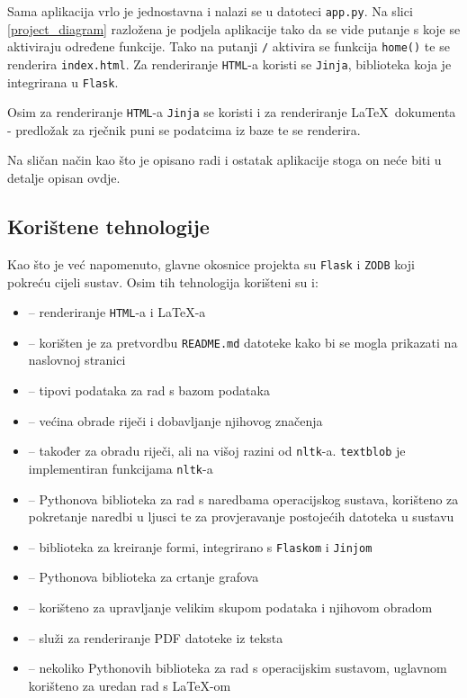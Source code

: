 \documentclass{foi}
\begin{document}
Sama aplikacija vrlo je jednostavna i nalazi se u datoteci \texttt{app.py}. Na
slici \ref{project_diagram} razložena je podjela aplikacije tako da se vide putanje s koje
se aktiviraju određene funkcije. Tako na putanji \texttt{/} aktivira se funkcija
\texttt{home()} te se renderira \texttt{index.html}. Za renderiranje
\texttt{HTML}-a koristi se \texttt{Jinja}, biblioteka koja je integrirana u
\texttt{Flask}.

Osim za renderiranje \texttt{HTML}-a \texttt{Jinja} se koristi i za
renderiranje \LaTeX\ dokumenta - predložak za rječnik puni se podatcima iz baze
te se renderira.

Na sličan način kao što je opisano radi i ostatak aplikacije stoga on neće biti
u detalje opisan ovdje.

\subsection{Korištene tehnologije}

Kao što je već napomenuto, glavne okosnice projekta su \texttt{Flask} i
\texttt{ZODB} koji pokreću cijeli sustav. Osim tih tehnologija korišteni su i:
\begin{itemize}
	\item[\texttt{Jinja}] -- renderiranje \texttt{HTML}-a i \LaTeX-a
	\item[\texttt{markdown2}] -- korišten je za pretvordbu
		\texttt{README.md} datoteke kako bi se mogla prikazati na
		naslovnoj stranici
	\item[\texttt{persistent}] -- tipovi podataka za rad s bazom podataka
	\item[\texttt{nltk}] -- većina obrade riječi i dobavljanje njihovog
		značenja
	\item[\texttt{textblob}] -- također za obradu riječi, ali na višoj
		razini od \texttt{nltk}-a. \texttt{textblob} je implementiran
		funkcijama \texttt{nltk}-a
	\item[\texttt{os}] -- Pythonova biblioteka za rad s naredbama
		operacijskog sustava, korišteno za pokretanje naredbi u ljusci
		te za provjeravanje postojećih datoteka u sustavu
	\item[\texttt{wtforms}] -- biblioteka za kreiranje formi, integrirano s
		\texttt{Flaskom} i \texttt{Jinjom}
	\item[\texttt{matplotlib}] -- Pythonova biblioteka za crtanje grafova
	\item[\texttt{padnas}] -- korišteno za upravljanje velikim skupom
		podataka i njihovom obradom
	\item[\LaTeX] -- služi za renderiranje PDF datoteke iz teksta
	\item[ostalo] -- nekoliko Pythonovih biblioteka za rad s operacijskim
		sustavom, uglavnom korišteno za uredan rad s \LaTeX-om
\end{itemize}
\end{document}
